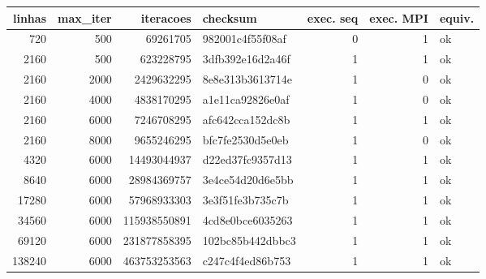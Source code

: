 \begin{tabular}{rrrlrrl}
\toprule
linhas & max\_iter & iteracoes & checksum & exec. seq & exec. MPI & equiv. \\
\midrule
720 & 500 & 69261705 & 982001c4f55f08af & 0 & 1 & ok \\
2160 & 500 & 623228795 & 3dfb392e16d2a46f & 1 & 1 & ok \\
2160 & 2000 & 2429632295 & 8e8e313b3613714e & 1 & 0 & ok \\
2160 & 4000 & 4838170295 & a1e11ca92826e0af & 1 & 0 & ok \\
2160 & 6000 & 7246708295 & afc642cca152dc8b & 1 & 1 & ok \\
2160 & 8000 & 9655246295 & bfc7fe2530d5e0eb & 1 & 0 & ok \\
4320 & 6000 & 14493044937 & d22ed37fc9357d13 & 1 & 1 & ok \\
8640 & 6000 & 28984369757 & 3e4ce54d20d6e5bb & 1 & 1 & ok \\
17280 & 6000 & 57968933303 & 3e3f51fe3b735c7b & 1 & 1 & ok \\
34560 & 6000 & 115938550891 & 4cd8e0bce6035263 & 1 & 1 & ok \\
69120 & 6000 & 231877858395 & 102bc85b442dbbc3 & 1 & 1 & ok \\
138240 & 6000 & 463753253563 & c247c4f4ed86b753 & 1 & 1 & ok \\
\bottomrule
\end{tabular}
